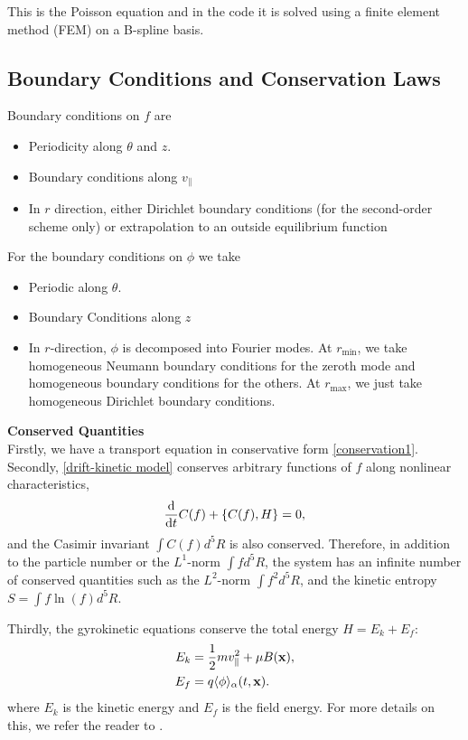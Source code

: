 This is the Poisson equation and in the code it is solved using a finite element method (FEM) on a B-spline basis.




\subsection{Boundary Conditions and Conservation Laws}

Boundary conditions on $f$ are
\begin{itemize}
    \item Periodicity along $\theta$ and $z$.
    \item Boundary conditions along $v_\parallel$ %
    \item In $r$ direction, either Dirichlet boundary conditions (for the second-order scheme only) or extrapolation to an outside equilibrium function
\end{itemize}

For the boundary conditions on $\phi$ we take
\begin{itemize}
    \item Periodic along $\theta$.
    \item Boundary Conditions along $z$ %
    \item In $r$-direction, $\phi$ is decomposed into Fourier modes. At $r_\text{min}$, we take homogeneous Neumann boundary conditions for the zeroth mode and homogeneous boundary conditions for the others. At $r_\text{max}$, we just take homogeneous Dirichlet boundary conditions.
\end{itemize}

\textbf{Conserved Quantities}\\
Firstly, we have a transport equation in conservative form \eqref{conservation1}. Secondly, \eqref{drift-kinetic model} conserves arbitrary functions of $f$  along nonlinear characteristics,
\begin{equation}
\frac{\text{d}}{\text{d} t} C(f) + \left\{ C(f), H \right\} =0,
\end{equation}
and the Casimir invariant $\int C( f ) d^5R$ is also conserved. Therefore, in addition to the particle number or the $L^1$-norm $\int f d^5R$, the system has an infinite number of conserved quantities such as the $L^2$-norm $\int f^2 d^5R$, and the kinetic entropy $S=\int f \ln(f) d^5R$.

Thirdly, the gyrokinetic equations conserve the total energy $H = E_k + E_f$:
\begin{subequations}
	\begin{align}
		E_k &= \frac{1}{2} m v_\parallel^2 + \mu B(\mathbf{x}),\\
		E_f &= q \langle \phi \rangle_\alpha (t,\mathbf{x}).
	\end{align}
\end{subequations}
where $E_k$ is the kinetic energy and $E_f$ is the field energy. For more details on this, we refer the reader to \cite{idomura2008conservative}.
